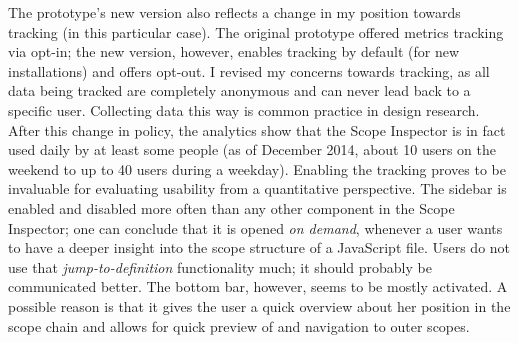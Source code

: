 The prototype’s new version also reflects a change in my position
towards tracking (in this particular case). The original prototype
offered metrics tracking via opt-in; the new version, however, enables
tracking by default (for new installations) and offers opt-out. I
revised my concerns towards tracking, as all data being tracked are
completely anonymous and can never lead back to a specific user.
Collecting data this way is common practice in design research. After
this change in policy, the analytics show that the Scope Inspector is in
fact used daily by at least some people (as of December 2014, about 10
users on the weekend to up to 40 users during a weekday). Enabling the
tracking proves to be invaluable for evaluating usability from a
quantitative perspective. The sidebar is enabled and disabled more often
than any other component in the Scope Inspector; one can conclude that
it is opened \emph{on demand}, whenever a user wants to have a deeper
insight into the scope structure of a JavaScript file. Users do not use
that \emph{jump-to-definition} functionality much; it should probably be
communicated better. The bottom bar, however, seems to be mostly
activated. A possible reason is that it gives the user a quick overview
about her position in the scope chain and allows for quick preview of
and navigation to outer scopes.
